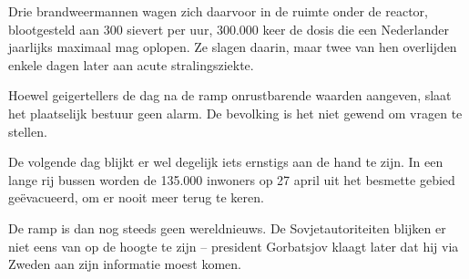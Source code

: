 Drie brandweermannen wagen zich daarvoor in de ruimte onder de reactor, blootgesteld aan 300 sievert per uur, 300.000 keer de dosis die een Nederlander jaarlijks maximaal mag oplopen. Ze slagen daarin, maar twee van hen overlijden enkele dagen later aan acute stralingsziekte.

Hoewel geigertellers de dag na de ramp onrustbarende waarden aangeven, slaat het plaatselijk bestuur geen alarm. De bevolking is het niet gewend om vragen te stellen.

De volgende dag blijkt er wel degelijk iets ernstigs aan de hand te zijn. In een lange rij bussen worden de 135.000 inwoners op 27 april uit het besmette gebied geëvacueerd, om er nooit meer terug te keren.

De ramp is dan nog steeds geen wereldnieuws. De Sovjetautoriteiten blijken er niet eens van op de hoogte te zijn – president Gorbatsjov klaagt later dat hij via Zweden aan zijn informatie moest komen.


